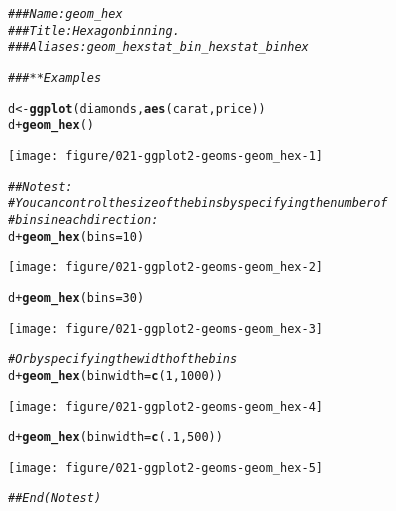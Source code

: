 \documentclass[a4paper,titlepage]{tufte-handout}\usepackage[]{graphicx}\usepackage[]{color}
\makeatletter
\def\maxwidth{ %
  \ifdim\Gin@nat@width>\linewidth
    \linewidth
  \else
    \Gin@nat@width
  \fi
}
\newcommand{\hlnum}[1]{\textcolor[rgb]{0.686,0.059,0.569}{#1}}%
\newcommand{\hlcom}[1]{\textcolor[rgb]{0.678,0.584,0.686}{\textit{#1}}}%
\newcommand{\hlopt}[1]{\textcolor[rgb]{0,0,0}{#1}}%
\newcommand{\hlstd}[1]{\textcolor[rgb]{0.345,0.345,0.345}{#1}}%
\newcommand{\hlkwb}[1]{\textcolor[rgb]{0.69,0.353,0.396}{#1}}%
\newcommand{\hlkwc}[1]{\textcolor[rgb]{0.333,0.667,0.333}{#1}}%
\newcommand{\hlkwd}[1]{\textcolor[rgb]{0.737,0.353,0.396}{\textbf{#1}}}%
\newenvironment{kframe}{%
 \def\at@end@of@kframe{}%
 \ifinner\ifhmode%
  \def\at@end@of@kframe{\end{minipage}}%
  \begin{minipage}{\columnwidth}%
 \fi\fi%
 \def\FrameCommand##1{\hskip\@totalleftmargin \hskip-\fboxsep
 \colorbox{shadecolor}{##1}\hskip-\fboxsep
     \hskip-\linewidth \hskip-\@totalleftmargin \hskip\columnwidth}%
 \MakeFramed {\advance\hsize-\width
   \@totalleftmargin\z@ \linewidth\hsize
   \@setminipage}}%
 {\par\unskip\endMakeFramed%
 \at@end@of@kframe}
\newenvironment{knitrout}{}{} %
\makeatother
\begin{document}
\begin{knitrout}
\color{fgcolor}\begin{kframe}
\begin{alltt}
\hlcom{### Name: geom_hex}
\hlcom{### Title: Hexagon binning.}
\hlcom{### Aliases: geom_hex stat_bin_hex stat_binhex}

\hlcom{### ** Examples}

\hlstd{d} \hlkwb{<-} \hlkwd{ggplot}\hlstd{(diamonds,} \hlkwd{aes}\hlstd{(carat, price))}
\hlstd{d} \hlopt{+} \hlkwd{geom_hex}\hlstd{()}
\end{alltt}
\end{kframe}
\texttt{[image: figure/021-ggplot2-geoms-geom\_hex-1]} 
\begin{kframe}\begin{alltt}
\hlcom{## No test: }
\hlcom{# You can control the size of the bins by specifying the number of}
\hlcom{# bins in each direction:}
\hlstd{d} \hlopt{+} \hlkwd{geom_hex}\hlstd{(}\hlkwc{bins} \hlstd{=} \hlnum{10}\hlstd{)}
\end{alltt}
\end{kframe}
\texttt{[image: figure/021-ggplot2-geoms-geom\_hex-2]} 
\begin{kframe}\begin{alltt}
\hlstd{d} \hlopt{+} \hlkwd{geom_hex}\hlstd{(}\hlkwc{bins} \hlstd{=} \hlnum{30}\hlstd{)}
\end{alltt}
\end{kframe}
\texttt{[image: figure/021-ggplot2-geoms-geom\_hex-3]} 
\begin{kframe}\begin{alltt}
\hlcom{# Or by specifying the width of the bins}
\hlstd{d} \hlopt{+} \hlkwd{geom_hex}\hlstd{(}\hlkwc{binwidth} \hlstd{=} \hlkwd{c}\hlstd{(}\hlnum{1}\hlstd{,} \hlnum{1000}\hlstd{))}
\end{alltt}
\end{kframe}
\texttt{[image: figure/021-ggplot2-geoms-geom\_hex-4]} 
\begin{kframe}\begin{alltt}
\hlstd{d} \hlopt{+} \hlkwd{geom_hex}\hlstd{(}\hlkwc{binwidth} \hlstd{=} \hlkwd{c}\hlstd{(}\hlnum{.1}\hlstd{,} \hlnum{500}\hlstd{))}
\end{alltt}
\end{kframe}
\texttt{[image: figure/021-ggplot2-geoms-geom\_hex-5]} 
\begin{kframe}\begin{alltt}
\hlcom{## End(No test)}
\end{alltt}
\end{kframe}
\end{knitrout}
\end{document}
